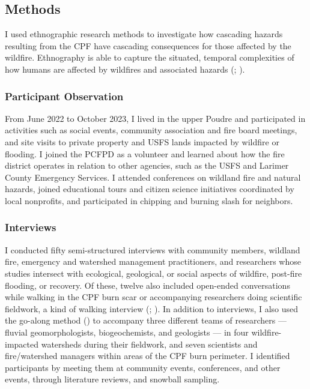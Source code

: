 \documentclass[
]{article}
\begin{document}
\subsection{Methods}\label{methods}

I used ethnographic research methods to investigate how cascading hazards resulting from the CPF have cascading consequences for those affected by the wildfire. Ethnography is able to capture the situated, temporal complexities of how humans are affected by wildfires and associated hazards (; ).

\subsubsection{Participant Observation}\label{participant-observation}

From June 2022 to October 2023, I lived in the upper Poudre and participated in activities such as social events, community association and fire board meetings, and site visits to private property and USFS lands impacted by wildfire or flooding. I joined the PCFPD as a volunteer and learned about how the fire district operates in relation to other agencies, such as the USFS and Larimer County Emergency Services. I attended conferences on wildland fire and natural hazards, joined educational tours and citizen science initiatives coordinated by local nonprofits, and participated in chipping and burning slash for neighbors.

\subsubsection{Interviews}\label{interviews}

I conducted fifty semi-structured interviews with community members, wildland fire, emergency and watershed management practitioners, and researchers whose studies intersect with ecological, geological, or social aspects of wildfire, post-fire flooding, or recovery. Of these, twelve also included open-ended conversations while walking in the CPF burn scar or accompanying researchers doing scientific fieldwork, a kind of walking interview (; ). In addition to interviews, I also used the go-along method () to accompany three different teams of researchers --- fluvial geomorphologists, biogeochemists, and geologists --- in four wildfire-impacted watersheds during their fieldwork, and seven scientists and fire/watershed managers within areas of the CPF burn perimeter. I identified participants by meeting them at community events, conferences, and other events, through literature reviews, and snowball sampling.
\end{document}
